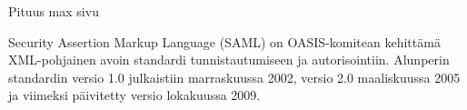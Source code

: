 Pituus max sivu

Security Assertion Markup Language (SAML) on OASIS-komitean kehittämä XML-pohjainen avoin standardi tunnistautumiseen ja autorisointiin. Alunperin standardin versio 1.0 julkaistiin marraskuussa 2002, versio 2.0 maaliskuussa 2005 ja viimeksi päivitetty versio lokakuussa 2009.
